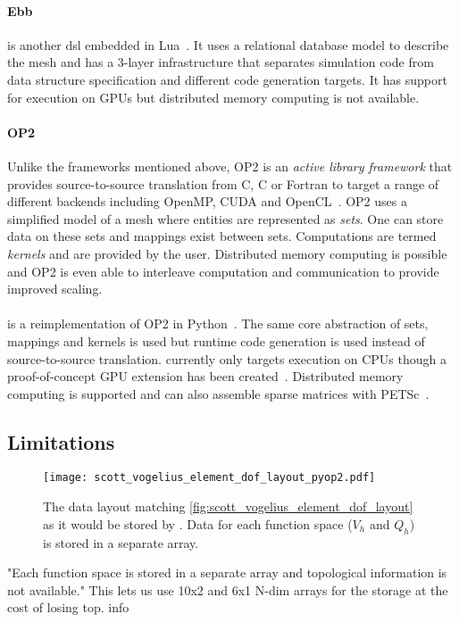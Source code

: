 \documentclass[thesis]{subfiles}
\begin{document}
\paragraph{Ebb}{
  is another \gls{dsl} embedded in Lua\footnotemark[\value{footnote}]~\cite{bernsteinEbbDSLPhysical2016}.
  It uses a relational database model to describe the mesh and has a 3-layer infrastructure that separates simulation code from data structure specification and different code generation targets.
  It has support for execution on GPUs but distributed memory computing is not available.
}


\paragraph{OP2}{
  Unlike the frameworks mentioned above, OP2 is an \textit{active library framework} that provides source-to-source translation from C, C\+\+ or Fortran to target a range of different backends including OpenMP, CUDA and OpenCL~\cite{mudaligeOP2ActiveLibrary2012}.
  OP2 uses a simplified model of a mesh where entities are represented as \textit{sets}.
  One can store data on these sets and mappings exist between sets.
  Computations are termed \textit{kernels} and are provided by the user.
  Distributed memory computing is possible and OP2 is even able to interleave computation and communication to provide improved scaling.
}

\paragraph{}{
  is a reimplementation of OP2 in Python~\cite{rathgeberPyOP2HighLevelFramework2012}.
  The same core abstraction of sets, mappings and kernels is used but runtime code generation is used instead of source-to-source translation.
   currently only targets execution on CPUs though a proof-of-concept GPU extension has been created~\cite{fenics2021-kulkarni}.
  Distributed memory computing is supported and  can also assemble sparse matrices with PETSc~\cite{petsc-web-page,petsc-user-ref,petsc-efficient}.
}

\subsection{Limitations}

\begin{figure}
  \centering
  \texttt{[image: scott\_vogelius\_element\_dof\_layout\_pyop2.pdf]}
  \caption{
    The data layout matching \cref{fig:scott_vogelius_element_dof_layout} as it would be stored by .
    Data for each function space ($V_h$ and $Q_h$) is stored in a separate array.
  }
  \label{fig:scott_vogelius_element_dof_layout_pyop2}
\end{figure}
    "Each function space is stored in a separate array and topological information is not available." This lets us use 10x2 and 6x1 N-dim arrays for the storage at the cost of losing top. info
\end{document}

